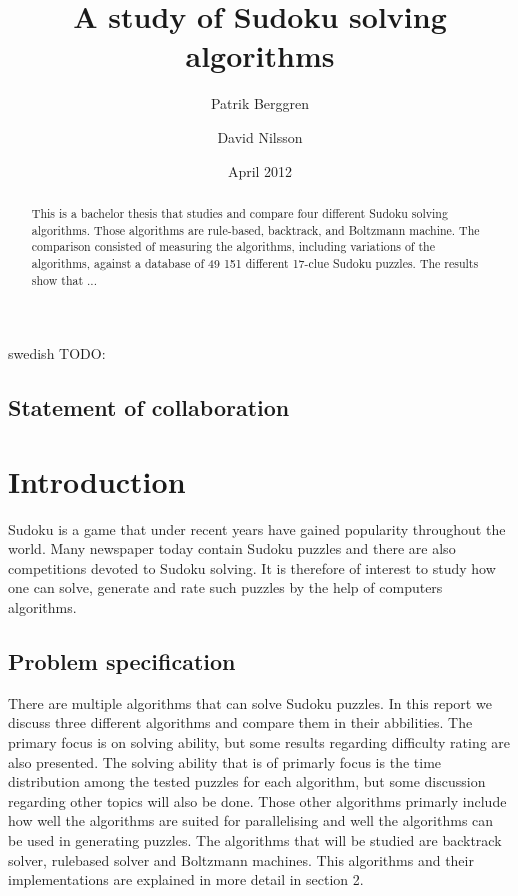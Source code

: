 \documentclass[a4paper,11pt]{kth-mag}
\title{A study of Sudoku solving algorithms}
\subtitle{}
\author{Patrik Berggren \and David Nilsson}
\date{April 2012}
\begin{document}
\frontmatter
\pagestyle{empty}
\removepagenumbers
\maketitle
{}
\begin{abstract}
This is a bachelor thesis that studies and compare four different Sudoku
solving algorithms.
Those algorithms are rule-based, backtrack, and Boltzmann machine.
 The comparison consisted of measuring the algorithms, including
variations of the algorithms, against a database of 49 151 different 17-clue Sudoku
puzzles.
The results show that ...
\end{abstract}
\clearpage
\begin{foreignabstract}{swedish}
TODO: 
\end{foreignabstract}
\clearpage
\section{Statement of collaboration}
\clearpage
\tableofcontents*
\mainmatter
\pagestyle{newchap}

\chapter{Introduction}
Sudoku is a game that under recent years have gained popularity throughout the world.
Many newspaper today contain Sudoku puzzles and there are also competitions devoted 
to Sudoku solving.
It is therefore of interest to study how one can solve, generate and rate such puzzles by the help of computers algorithms.

\FloatBarrier
\section{Problem specification}
There are multiple algorithms that can solve Sudoku puzzles.
In this report we discuss three different algorithms and compare them in their abbilities.
The primary focus is on solving ability, but some results regarding difficulty rating are also presented.
The solving ability that is of primarly focus is the time distribution among the tested puzzles for each algorithm, but some discussion regarding other topics will also be done.
Those other algorithms primarly include how well the algorithms are suited for parallelising and well the algorithms can be used in generating puzzles.
The algorithms that will be studied are backtrack solver, rulebased solver and Boltzmann machines. 
This algorithms and their implementations are explained in more detail in section 2. 
\end{document}
